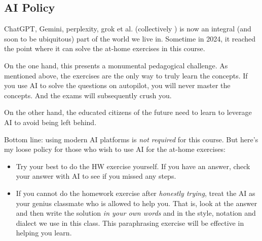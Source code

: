 \subsection*{AI Policy}

ChatGPT, Gemini, perplexity, grok et al. (collectively ) is now an integral (and soon to be ubiquitous) part of the world we live in. Sometime in 2024, it reached the point where it can solve the at-home exercises in this course. 

On the one hand, this presents a monumental pedagogical challenge. As mentioned above, the exercises are the only way to truly learn the concepts. If you use AI to solve the questions on autopilot, you will never master the concepts. And the exams will subsequently crush you. 

On the other hand, the educated citizens of the future need to learn to leverage AI to avoid being left behind.

Bottom line: using modern AI platforms is \emph{not required} for this course. But here's my loose policy for those who wish to use AI for the at-home exercises:

\begin{itemize}
\item Try your best to do the HW exercise yourself. If you have an answer, check your answer with AI to see if you missed any steps.
\item If you cannot do the homework exercise after \emph{honestly trying}, treat the AI as your genius classmate who is allowed to help you. That is, look at the answer and then write the solution \emph{in your own words} and in the style, notation and dialect we use in this class. This paraphrasing exercise will be effective in helping you learn.
\end{itemize}
